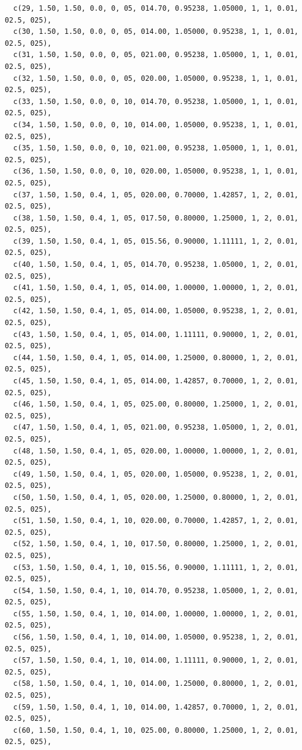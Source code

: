 \begin{lstlisting}
  c(29, 1.50, 1.50, 0.0, 0, 05, 014.70, 0.95238, 1.05000, 1, 1, 0.01, 02.5, 025),
  c(30, 1.50, 1.50, 0.0, 0, 05, 014.00, 1.05000, 0.95238, 1, 1, 0.01, 02.5, 025),
  c(31, 1.50, 1.50, 0.0, 0, 05, 021.00, 0.95238, 1.05000, 1, 1, 0.01, 02.5, 025),
  c(32, 1.50, 1.50, 0.0, 0, 05, 020.00, 1.05000, 0.95238, 1, 1, 0.01, 02.5, 025),
  c(33, 1.50, 1.50, 0.0, 0, 10, 014.70, 0.95238, 1.05000, 1, 1, 0.01, 02.5, 025),
  c(34, 1.50, 1.50, 0.0, 0, 10, 014.00, 1.05000, 0.95238, 1, 1, 0.01, 02.5, 025),
  c(35, 1.50, 1.50, 0.0, 0, 10, 021.00, 0.95238, 1.05000, 1, 1, 0.01, 02.5, 025),
  c(36, 1.50, 1.50, 0.0, 0, 10, 020.00, 1.05000, 0.95238, 1, 1, 0.01, 02.5, 025),
  c(37, 1.50, 1.50, 0.4, 1, 05, 020.00, 0.70000, 1.42857, 1, 2, 0.01, 02.5, 025),
  c(38, 1.50, 1.50, 0.4, 1, 05, 017.50, 0.80000, 1.25000, 1, 2, 0.01, 02.5, 025),
  c(39, 1.50, 1.50, 0.4, 1, 05, 015.56, 0.90000, 1.11111, 1, 2, 0.01, 02.5, 025),
  c(40, 1.50, 1.50, 0.4, 1, 05, 014.70, 0.95238, 1.05000, 1, 2, 0.01, 02.5, 025),
  c(41, 1.50, 1.50, 0.4, 1, 05, 014.00, 1.00000, 1.00000, 1, 2, 0.01, 02.5, 025),
  c(42, 1.50, 1.50, 0.4, 1, 05, 014.00, 1.05000, 0.95238, 1, 2, 0.01, 02.5, 025),
  c(43, 1.50, 1.50, 0.4, 1, 05, 014.00, 1.11111, 0.90000, 1, 2, 0.01, 02.5, 025),
  c(44, 1.50, 1.50, 0.4, 1, 05, 014.00, 1.25000, 0.80000, 1, 2, 0.01, 02.5, 025),
  c(45, 1.50, 1.50, 0.4, 1, 05, 014.00, 1.42857, 0.70000, 1, 2, 0.01, 02.5, 025),
  c(46, 1.50, 1.50, 0.4, 1, 05, 025.00, 0.80000, 1.25000, 1, 2, 0.01, 02.5, 025),
  c(47, 1.50, 1.50, 0.4, 1, 05, 021.00, 0.95238, 1.05000, 1, 2, 0.01, 02.5, 025),
  c(48, 1.50, 1.50, 0.4, 1, 05, 020.00, 1.00000, 1.00000, 1, 2, 0.01, 02.5, 025),
  c(49, 1.50, 1.50, 0.4, 1, 05, 020.00, 1.05000, 0.95238, 1, 2, 0.01, 02.5, 025),
  c(50, 1.50, 1.50, 0.4, 1, 05, 020.00, 1.25000, 0.80000, 1, 2, 0.01, 02.5, 025),
  c(51, 1.50, 1.50, 0.4, 1, 10, 020.00, 0.70000, 1.42857, 1, 2, 0.01, 02.5, 025),
  c(52, 1.50, 1.50, 0.4, 1, 10, 017.50, 0.80000, 1.25000, 1, 2, 0.01, 02.5, 025),
  c(53, 1.50, 1.50, 0.4, 1, 10, 015.56, 0.90000, 1.11111, 1, 2, 0.01, 02.5, 025),
  c(54, 1.50, 1.50, 0.4, 1, 10, 014.70, 0.95238, 1.05000, 1, 2, 0.01, 02.5, 025),
  c(55, 1.50, 1.50, 0.4, 1, 10, 014.00, 1.00000, 1.00000, 1, 2, 0.01, 02.5, 025),
  c(56, 1.50, 1.50, 0.4, 1, 10, 014.00, 1.05000, 0.95238, 1, 2, 0.01, 02.5, 025),
  c(57, 1.50, 1.50, 0.4, 1, 10, 014.00, 1.11111, 0.90000, 1, 2, 0.01, 02.5, 025),
  c(58, 1.50, 1.50, 0.4, 1, 10, 014.00, 1.25000, 0.80000, 1, 2, 0.01, 02.5, 025),
  c(59, 1.50, 1.50, 0.4, 1, 10, 014.00, 1.42857, 0.70000, 1, 2, 0.01, 02.5, 025),
  c(60, 1.50, 1.50, 0.4, 1, 10, 025.00, 0.80000, 1.25000, 1, 2, 0.01, 02.5, 025),

\end{lstlisting}
